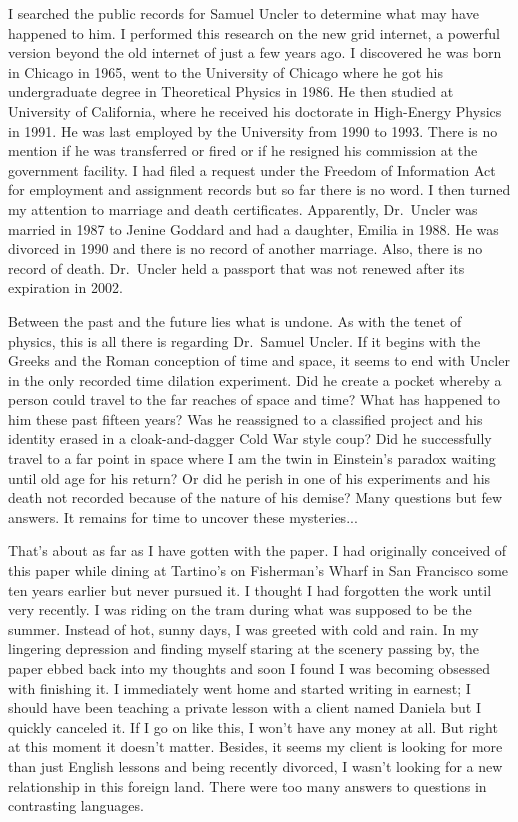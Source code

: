 \documentclass[
]{article}
\begin{document}
I searched the public records for Samuel Uncler to determine what may
have happened to him. I performed this research on the new grid
internet, a powerful version beyond the old internet of just a few years
ago. I discovered he was born in Chicago in 1965, went to the University
of Chicago where he got his undergraduate degree in Theoretical Physics
in 1986. He then studied at University of California, where he received
his doctorate in High-Energy Physics in 1991. He was last employed by
the University from 1990 to 1993. There is no mention if he was
transferred or fired or if he resigned his commission at the government
facility. I had filed a request under the Freedom of Information Act for
employment and assignment records but so far there is no word. I then
turned my attention to marriage and death certificates. Apparently,
Dr.~Uncler was married in 1987 to Jenine Goddard and had a daughter,
Emilia in 1988. He was divorced in 1990 and there is no record of
another marriage. Also, there is no record of death. Dr.~Uncler held a
passport that was not renewed after its expiration in 2002.

Between the past and the future lies what is undone. As with the tenet
of physics, this is all there is regarding Dr.~Samuel Uncler. If it
begins with the Greeks and the Roman conception of time and space, it
seems to end with Uncler in the only recorded time dilation experiment.
Did he create a pocket whereby a person could travel to the far reaches
of space and time? What has happened to him these past fifteen years?
Was he reassigned to a classified project and his identity erased in a
cloak-and-dagger Cold War style coup? Did he successfully travel to a
far point in space where I am the twin in Einstein's paradox waiting
until old age for his return? Or did he perish in one of his experiments
and his death not recorded because of the nature of his demise? Many
questions but few answers. It remains for time to uncover these
mysteries...

That's about as far as I have gotten with the paper. I had originally
conceived of this paper while dining at Tartino's on Fisherman's Wharf
in San Francisco some ten years earlier but never pursued it. I thought
I had forgotten the work until very recently. I was riding on the tram
during what was supposed to be the summer. Instead of hot, sunny days, I
was greeted with cold and rain. In my lingering depression and finding
myself staring at the scenery passing by, the paper ebbed back into my
thoughts and soon I found I was becoming obsessed with finishing it. I
immediately went home and started writing in earnest; I should have been
teaching a private lesson with a client named Daniela but I quickly
canceled it. If I go on like this, I won't have any money at all. But
right at this moment it doesn't matter. Besides, it seems my client is
looking for more than just English lessons and being recently divorced,
I wasn't looking for a new relationship in this foreign land. There were
too many answers to questions in contrasting languages.
\end{document}
